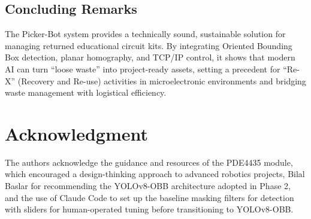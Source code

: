 \documentclass[conference]{IEEEtran}
\begin{document}
\subsection{Concluding Remarks}
The Picker-Bot system provides a technically sound, sustainable solution for managing returned educational circuit kits. By integrating Oriented Bounding Box detection, planar homography, and TCP/IP control, it shows that modern AI can turn ``loose waste'' into project-ready assets, setting a precedent for ``Re-X'' (Recovery and Re-use) activities in microelectronic environments and bridging waste management with logistical efficiency.
\section*{Acknowledgment}
The authors acknowledge the guidance and resources of the PDE4435 module, which encouraged a design-thinking approach to advanced robotics projects, Bilal Baslar for recommending the YOLOv8-OBB architecture adopted in Phase 2, and the use of Claude Code to set up the baseline masking filters for detection with sliders for human-operated tuning before transitioning to YOLOv8-OBB.
\end{document}
